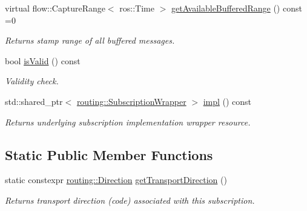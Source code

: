 \begin{DoxyCompactItemize}
\mbox{\label{classflow__ros_1_1_subscriber_base_a7cea45e8cbbeb3f7406dd5b4336d86d5}} 
virtual flow\+::\+Capture\+Range$<$ ros\+::\+Time $>$ \hyperlink{classflow__ros_1_1_subscriber_base_a7cea45e8cbbeb3f7406dd5b4336d86d5}{get\+Available\+Buffered\+Range} () const =0
\begin{DoxyCompactList}\small\item\em Returns stamp range of all buffered messages. \end{DoxyCompactList}\item 
bool \hyperlink{classflow__ros_1_1_subscriber_base_a1c2ed330f95a5711c6f71b80b556e742}{is\+Valid} () const
\begin{DoxyCompactList}\small\item\em Validity check. \end{DoxyCompactList}\item 
\mbox{\label{classflow__ros_1_1_subscriber_base_a776d32808c392411b4e9b308c79d866b}} 
std\+::shared\+\_\+ptr$<$ \hyperlink{classflow__ros_1_1routing_1_1_subscription_wrapper}{routing\+::\+Subscription\+Wrapper} $>$ \hyperlink{classflow__ros_1_1_subscriber_base_a776d32808c392411b4e9b308c79d866b}{impl} () const
\begin{DoxyCompactList}\small\item\em Returns underlying subscription implementation wrapper resource. \end{DoxyCompactList}\end{DoxyCompactItemize}
\subsection*{Static Public Member Functions}
\begin{DoxyCompactItemize}
\item 
static constexpr \hyperlink{transport__info_8h_acb4b6ac875de32a0d0ee8cec235f7752}{routing\+::\+Direction} \hyperlink{classflow__ros_1_1_subscriber_base_a260255c9a1a05e1fa60a076177609f57}{get\+Transport\+Direction} ()
\begin{DoxyCompactList}\small\item\em Returns transport direction (code) associated with this subscription. \end{DoxyCompactList}\end{DoxyCompactItemize}

